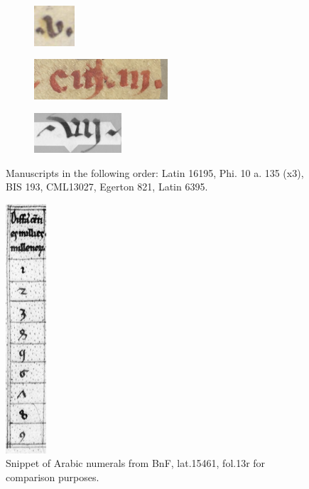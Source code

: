 \documentclass{article}
\begin{document}
\begin{figure}[H]
\begin{subfigure}{0.20\linewidth}
    \end{subfigure}
    \begin{subfigure}{0.20\linewidth}
    \centering
    \includegraphics[height=1.5cm]{datapaper/images/examples/numerals/roman_numeral_CML13027.png}
    \end{subfigure}
    \begin{subfigure}{0.20\linewidth}
    \centering
    \includegraphics[height=1.5cm]{datapaper/images/examples/numerals/roman_numeral_egerton821.png}
    \end{subfigure}  
    \begin{subfigure}{0.20\linewidth}
    \centering
    \includegraphics[height=1.5cm]{datapaper/images/examples/numerals/roman_numeral_Latin6395.png}
    \end{subfigure}
    \caption{Manuscripts in the following order: Latin 16195, Phi. 10 a. 135 (x3), BIS 193, CML13027, Egerton 821, Latin 6395.}
    \label{fig:numerals}
\end{figure}

\begin{figure}[H]
    \centering
    \includegraphics[width=1.5cm,angle=90]{datapaper/images/examples/numerals/BnF, lat.15461, fol.13r.jpeg}
    \caption{Snippet of Arabic numerals from BnF, lat.15461, fol.13r for comparison purposes.}
    \label{fig:numerals2}
\end{figure}
\end{document}

